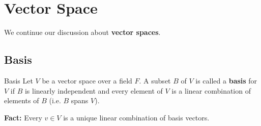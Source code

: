 \documentclass[letterpaper]{article}
\begin{document}
\section{Vector Space}
We continue our discussion about \textbf{vector spaces}.

\subsection{Basis}
\begin{definition}{Basis}{}
    Let $V$ be a vector space over a field $F$. A subset $B$ of $V$ is called a \textbf{basis} for $V$ if $B$ is linearly independent and every element of $V$ is a linear combination of elements of $B$ (i.e. $B$ spans $V$).
\end{definition}
\textbf{Fact:} Every $v \in V$ is a unique linear combination of basis vectors. 
\end{document}

